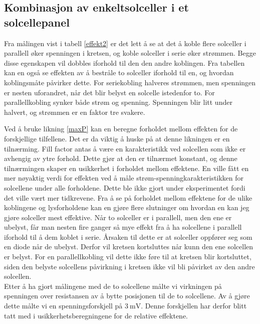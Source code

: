 \documentclass[%
 reprint,
 amsmath,amssymb,
 aps,
 norsk,
 booktabs
]{revtex4-1}
\begin{document}
\subsection{Kombinasjon av enkeltsolceller i et solcellepanel}
Fra målingen vist i tabell \vref{effekt2} er det lett å se at det å koble flere solceller i parallell øker spenningen i kretsen, og koble solceller i serie øker strømmen. Begge disse egenskapen vil dobbles iforhold til den den andre koblingen. Fra tabellen kan en også se effekten av å bestråle to solceller iforhold til en, og hvordan koblingsmåte påvirker dette. For seriekobling halveres strømmen, men spenningen er nesten uforandret, når det blir belyst en solcelle istedenfor to. For parallellkobling synker både strøm og spenning. Spenningen blir litt under halvert, og strømmen er en faktor tre svakere.\par
Ved å bruke likning \eqref{maxP} kan en beregne forholdet mellom effekten for de forskjellige tilfellene. Det er da viktig å huske på at denne likningen er en tilnærming. Fill factor antas å være en karakteristikk ved solcellen som ikke er avhengig av ytre forhold. Dette gjør at den er tilnærmet konstant, og denne tilnærmingen skaper en usikkerhet i forholdet mellom effektene. En ville fått en mer nøyaktig verdi for effekten ved å måle strøm-spenningkarakteristikken for solcellene under alle forholdene. Dette ble ikke gjort under eksperimentet fordi det ville vært mer tidkrevene. Fra å se på forholdet mellom effektene for de ulike koblingene og lysforholdene kan en gjøre flere slutninger om hvordan en kan jeg gjøre solceller mest effektive. Når to solceller er i parallell, men den ene er ubelyst, får man nesten fire ganger så mye effekt fra å ha solcellene i parallell iforhold til å dem koblet i serie. Årsaken til dette er at solceller oppfører seg som en diode når de ubelyst. Derfor vil kretsen kortsluttes når kunn den ene solcellen er belyst. For en parallellkobling vil dette ikke føre til at kretsen blir kortsluttet, siden den belyste solcellens påvirkning i kretsen ikke vil bli påvirket av den andre solcellen.\\
Etter å ha gjort målingene med de to solcellene målte vi virkningen på spenningen over resistansen av å bytte posisjonen til de to solcellene. Av å gjøre dette målte vi en spenningsforskjell på $\SI{3}{\milli\volt}$. Denne forskjellen har derfor blitt tatt med i usikkerhetsberegningene for de relative effektene.
\end{document}
